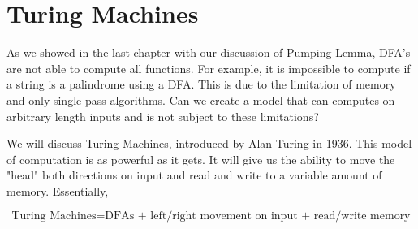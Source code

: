 \chapter{Turing Machines}

As we showed in the last chapter with our discussion of Pumping Lemma, DFA's are not able to compute all functions. For example, it is impossible to compute if a string is a palindrome using a DFA. This is due to the limitation of memory and only single pass algorithms. Can we create a model that can computes on arbitrary length inputs and is not subject to these limitations? 

We will discuss Turing Machines, introduced by Alan Turing in 1936. This model of computation is as powerful as it gets. It will give us the ability to move the "head" both directions on input and read and write to a variable amount of memory. Essentially,

\[
    \text{Turing Machines} = \text{DFAs + left/right movement on input + read/write memory}
\]

